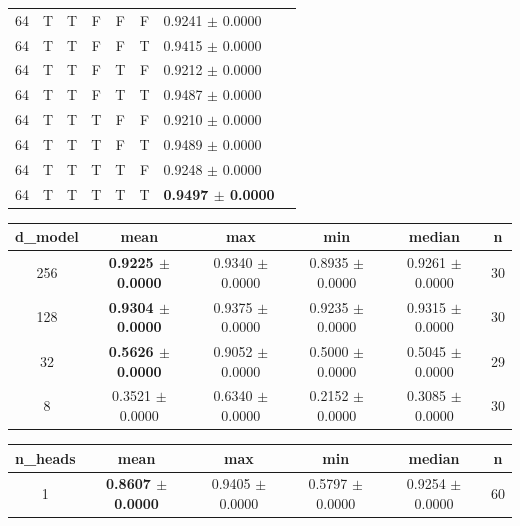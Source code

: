 \begin{tabular}{c c c c c c l c}
64 & T & T & F & F & F & 0.9241 $\pm$ 0.0000 \\
64 & T & T & F & F & T & 0.9415 $\pm$ 0.0000 \\
64 & T & T & F & T & F & 0.9212 $\pm$ 0.0000 \\
64 & T & T & F & T & T & 0.9487 $\pm$ 0.0000 \\
64 & T & T & T & F & F & 0.9210 $\pm$ 0.0000 \\
64 & T & T & T & F & T & 0.9489 $\pm$ 0.0000 \\
64 & T & T & T & T & F & 0.9248 $\pm$ 0.0000 \\
64 & T & T & T & T & T & \textbf{0.9497 $\pm$ 0.0000} \\
\bottomrule
\end{tabular}

\begin{tabular}{c c c c c c}
\toprule
d\_model & mean & max & min & median & n \\
\midrule
256 & \textbf{0.9225 $\pm$ 0.0000} & 0.9340 $\pm$ 0.0000 & 0.8935 $\pm$ 0.0000 & 0.9261 $\pm$ 0.0000 & 30 \\
128 & \textbf{0.9304 $\pm$ 0.0000} & 0.9375 $\pm$ 0.0000 & 0.9235 $\pm$ 0.0000 & 0.9315 $\pm$ 0.0000 & 30 \\
32 & \textbf{0.5626 $\pm$ 0.0000} & 0.9052 $\pm$ 0.0000 & 0.5000 $\pm$ 0.0000 & 0.5045 $\pm$ 0.0000 & 29 \\
8 & 0.3521 $\pm$ 0.0000 & 0.6340 $\pm$ 0.0000 & 0.2152 $\pm$ 0.0000 & 0.3085 $\pm$ 0.0000 & 30 \\
\bottomrule
\end{tabular}

\begin{tabular}{c c c c c c}
\toprule
n\_heads & mean & max & min & median & n \\
\midrule
1 & \textbf{0.8607 $\pm$ 0.0000} & 0.9405 $\pm$ 0.0000 & 0.5797 $\pm$ 0.0000 & 0.9254 $\pm$ 0.0000 & 60 \\
\bottomrule
\end{tabular}
